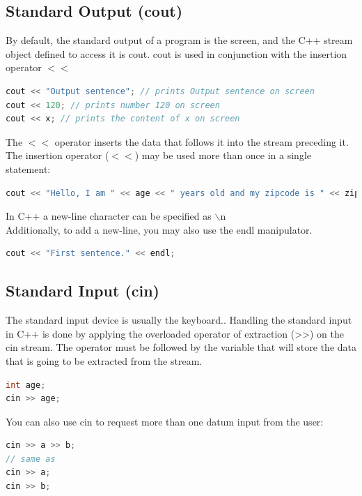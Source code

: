\documentclass[12pt,oneside]{book}
\begin{document}
\subsection{Standard Output (cout)}
By default, the standard output of a program is the screen, and the C++ stream object defined to access it is cout.
cout is used in conjunction with the insertion operator $<<$
\begin{lstlisting}[language=C++]
cout << "Output sentence"; // prints Output sentence on screen
cout << 120; // prints number 120 on screen
cout << x; // prints the content of x on screen
\end{lstlisting}
The $<<$ operator inserts the data that follows it into the stream preceding it.\\
The insertion operator ($<<$) may be used more than once in a single statement:
\begin{lstlisting}[language=C++]
    cout << "Hello, I am " << age << " years old and my zipcode is " << zipcode;
\end{lstlisting}
In C++ a new-line character can be specified as $\backslash$n\\
Additionally, to add a new-line, you may also use the endl manipulator.
	\begin{lstlisting}[language=C++]
    cout << "First sentence." << endl; 
\end{lstlisting}
\subsection{Standard Input (cin)}
The standard input device is usually the keyboard.. Handling the standard input in C++ is done by applying the
overloaded operator of extraction (>>) on the cin stream. The operator must be followed by the variable that will
store the data that is going to be extracted from the stream.
	\begin{lstlisting}[language=C++]
int age;
cin >> age;
\end{lstlisting}
You can also use cin to request more than one datum input from the user:
\begin{lstlisting}[language=C++]
cin >> a >> b;
// same as
cin >> a;
cin >> b;
\end{lstlisting}
\end{document}
